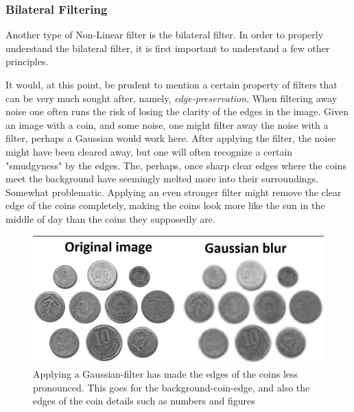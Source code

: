 \documentclass[twoside,a4paper,article]{combine}
\begin{document}
\subsubsection{Bilateral Filtering}
Another type of Non-Linear filter is the bilateral filter. In order to properly understand the bilateral filter, it is first important to understand a few other principles.

It would, at this point, be prudent to mention a certain property of filters that can be very much sought after, namely, \textit{edge-preservation}. When filtering away noise one often runs the risk of losing the clarity of the edges in the image. Given an image with a coin, and some noise, one might filter away the noise with a filter, perhaps a Gaussian would work here. After applying the filter, the noise might have been cleared away, but one will often recognize a certain "smudgyness" by the edges. The, perhaps, once sharp clear edges where the coins meet the background have seemingly melted more into their surroundings. Somewhat problematic. Applying an even stronger filter might remove the clear edge of the coins completely, making the coins look more like the sun in the middle of day than the coins they supposedly are.
\begin{figure}[H]
    \centering
    \includegraphics[width=1\linewidth]{coins.PNG}
    \caption{Applying a Gaussian-filter has made the edges of the coins less pronounced. This goes for the background-coin-edge, and also the edges of the coin details such as numbers and figures}
    \label{fig:enter-label}
\end{figure}
\end{document}
